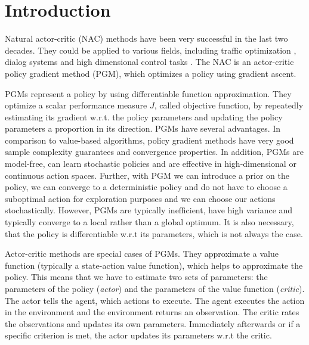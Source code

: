 \section{Introduction}
\label{sec:intro}

Natural actor-critic (NAC) methods \citep{peters2005natural} have been very successful in the last two decades. They could be applied to various fields, including traffic optimization \citep{richter2007natural}, dialog systems \citep{jurvcivcek2011natural} and high dimensional control tasks \citep{park2005rls, peters2008natural, peters2003reinforcement}. The NAC is an actor-critic policy gradient method (PGM), which optimizes a policy using gradient ascent.

PGMs represent a policy by using differentiable function approximation. They optimize a scalar performance measure $J$, called objective function, by repeatedly estimating its gradient w.r.t. the policy parameters and updating the policy parameters a proportion in its direction. PGMs have several advantages. In comparison to value-based algorithms, policy gradient methods have very good sample complexity guarantees \cite{nemirovski2005efficient} and convergence properties. In addition, PGMs are model-free, can learn stochastic policies and are effective in high-dimensional or continuous action spaces. Further, with PGM we can introduce a prior on the policy, we can converge to a deterministic policy and do not have to choose a suboptimal action for exploration purposes and we can choose our actions stochastically. However, PGMs are typically inefficient, have high variance and typically converge to a local rather than a global optimum. It is also necessary, that the policy is differentiable w.r.t its parameters, which is not always the case.

Actor-critic methods are special cases of PGMs. They approximate a value function (typically a state-action value function), which helps to approximate the policy. This means that we have to estimate two sets of parameters: the parameters of the policy (\textit{actor}) and the parameters of the value function (\textit{critic}). The actor tells the agent, which actions to execute. The agent executes the action in the environment and the environment returns an observation. The critic rates the observations and updates its own parameters. Immediately afterwards or if a specific criterion is met, the actor updates its parameters w.r.t the critic.


